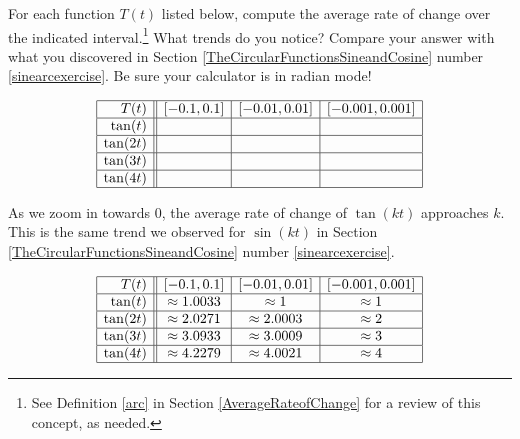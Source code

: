 \documentclass{ximera}
\begin{document}
\begin{problem} \label{tangentarcexercise}
For each function $T(t)$ listed below, compute the average rate of change over the indicated interval.\footnote{See Definition \ref{arc} in Section \ref{AverageRateofChange} for a review of this concept, as needed.}  What trends do you notice? Compare your answer with what you discovered in Section \ref{TheCircularFunctionsSineandCosine} number \ref{sinearcexercise}.  Be sure your calculator is in radian mode!

\[ \begin{array}{|r||c|c|c|}  \hline

 T(t) &  [-0.1, 0.1] & [-0.01, 0.01] &[-0.001, 0.001] \\ \hline
 \tan(t)     &&&  \\  \hline
 \tan(2t)   &&&  \\ \hline
 \tan(3t)   &&&   \\  \hline
 \tan(4t)   &&&   \\  \hline

\end{array} \]

\begin{solution}

As we zoom in towards $0$, the average rate of change of $\tan(k t)$ approaches $k$.  This is the same trend we observed for $\sin(k t)$ in Section \ref{TheCircularFunctionsSineandCosine} number \ref{sinearcexercise}.

\[ \begin{array}{|r||c|c|c|}  \hline

 T(t) &  [-0.1, 0.1] & [-0.01, 0.01] &[-0.001, 0.001] \\ \hline
 \tan(t)     & \approx 1.0033 & \approx 1 & \approx 1 \\  \hline
 \tan(2t)   & \approx 2.0271 & \approx 2.0003 & \approx 2 \\ \hline
 \tan(3t)   & \approx 3.0933 & \approx 3.0009 & \approx 3  \\  \hline
 \tan(4t)   & \approx 4.2279 & \approx 4.0021 & \approx 4  \\  \hline

\end{array} \]



\end{solution}

\end{problem}
\end{document}
